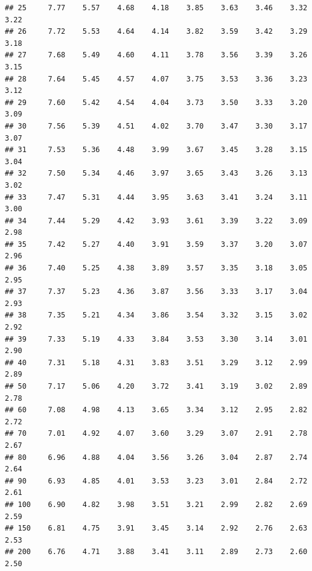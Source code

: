 \documentclass[onecolumn,12pt]{book}\usepackage[]{graphicx}\usepackage[]{color}
\makeatletter
\newenvironment{kframe}{%
 \def\at@end@of@kframe{}%
 \ifinner\ifhmode%
  \def\at@end@of@kframe{\end{minipage}}%
  \begin{minipage}{\columnwidth}%
 \fi\fi%
 \def\FrameCommand##1{\hskip\@totalleftmargin \hskip-\fboxsep
 \colorbox{shadecolor}{##1}\hskip-\fboxsep
     \hskip-\linewidth \hskip-\@totalleftmargin \hskip\columnwidth}%
 \MakeFramed {\advance\hsize-\width
   \@totalleftmargin\z@ \linewidth\hsize
   \@setminipage}}%
 {\par\unskip\endMakeFramed%
 \at@end@of@kframe}
\newenvironment{knitrout}{}{} %
\makeatother
\begin{document}
\begin{knitrout}
\begin{kframe}
\begin{verbatim}
## 25     7.77    5.57    4.68    4.18    3.85    3.63    3.46    3.32    3.22
## 26     7.72    5.53    4.64    4.14    3.82    3.59    3.42    3.29    3.18
## 27     7.68    5.49    4.60    4.11    3.78    3.56    3.39    3.26    3.15
## 28     7.64    5.45    4.57    4.07    3.75    3.53    3.36    3.23    3.12
## 29     7.60    5.42    4.54    4.04    3.73    3.50    3.33    3.20    3.09
## 30     7.56    5.39    4.51    4.02    3.70    3.47    3.30    3.17    3.07
## 31     7.53    5.36    4.48    3.99    3.67    3.45    3.28    3.15    3.04
## 32     7.50    5.34    4.46    3.97    3.65    3.43    3.26    3.13    3.02
## 33     7.47    5.31    4.44    3.95    3.63    3.41    3.24    3.11    3.00
## 34     7.44    5.29    4.42    3.93    3.61    3.39    3.22    3.09    2.98
## 35     7.42    5.27    4.40    3.91    3.59    3.37    3.20    3.07    2.96
## 36     7.40    5.25    4.38    3.89    3.57    3.35    3.18    3.05    2.95
## 37     7.37    5.23    4.36    3.87    3.56    3.33    3.17    3.04    2.93
## 38     7.35    5.21    4.34    3.86    3.54    3.32    3.15    3.02    2.92
## 39     7.33    5.19    4.33    3.84    3.53    3.30    3.14    3.01    2.90
## 40     7.31    5.18    4.31    3.83    3.51    3.29    3.12    2.99    2.89
## 50     7.17    5.06    4.20    3.72    3.41    3.19    3.02    2.89    2.78
## 60     7.08    4.98    4.13    3.65    3.34    3.12    2.95    2.82    2.72
## 70     7.01    4.92    4.07    3.60    3.29    3.07    2.91    2.78    2.67
## 80     6.96    4.88    4.04    3.56    3.26    3.04    2.87    2.74    2.64
## 90     6.93    4.85    4.01    3.53    3.23    3.01    2.84    2.72    2.61
## 100    6.90    4.82    3.98    3.51    3.21    2.99    2.82    2.69    2.59
## 150    6.81    4.75    3.91    3.45    3.14    2.92    2.76    2.63    2.53
## 200    6.76    4.71    3.88    3.41    3.11    2.89    2.73    2.60    2.50
\end{verbatim}
\end{kframe}
\end{knitrout}
\vfill
\eject
\end{document}
